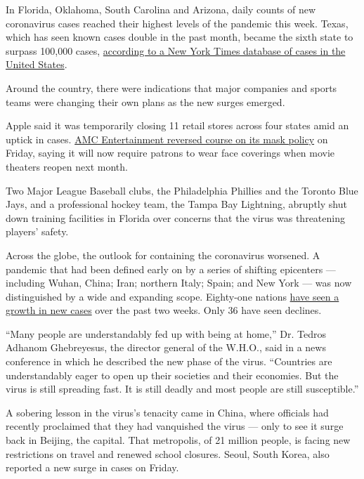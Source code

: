 In Florida, Oklahoma, South Carolina and Arizona, daily counts of new
coronavirus cases reached their highest levels of the pandemic this
week. Texas, which has seen known cases double in the past month, became
the sixth state to surpass 100,000 cases,
\href{https://www.nytimes.com/interactive/2020/us/texas-coronavirus-cases.html}{according
to a New York Times database of cases in the United States}.

Around the country, there were indications that major companies and
sports teams were changing their own plans as the new surges emerged.

Apple said it was temporarily closing 11 retail stores across four
states amid an uptick in cases.
\href{https://www.nytimes.com/2020/06/18/business/AMC-theaters-masks-coronavirus.html}{AMC
Entertainment reversed course on its mask policy} on Friday, saying it
will now require patrons to wear face coverings when movie theaters
reopen next month.

Two Major League Baseball clubs, the Philadelphia Phillies and the
Toronto Blue Jays, and a professional hockey team, the Tampa Bay
Lightning, abruptly shut down training facilities in Florida over
concerns that the virus was threatening players' safety.

Across the globe, the outlook for containing the coronavirus worsened. A
pandemic that had been defined early on by a series of shifting
epicenters --- including Wuhan, China; Iran; northern Italy; Spain; and
New York --- was now distinguished by a wide and expanding scope.
Eighty-one nations
\href{https://www.nytimes.com/interactive/2020/world/coronavirus-maps.html}{have
seen a growth in new cases} over the past two weeks. Only 36 have seen
declines.

``Many people are understandably fed up with being at home,'' Dr. Tedros
Adhanom Ghebreyesus, the director general of the W.H.O., said in a news
conference in which he described the new phase of the virus. ``Countries
are understandably eager to open up their societies and their economies.
But the virus is still spreading fast. It is still deadly and most
people are still susceptible.''

A sobering lesson in the virus's tenacity came in China, where officials
had recently proclaimed that they had vanquished the virus --- only to
see it surge back in Beijing, the capital. That metropolis, of 21
million people, is facing new restrictions on travel and renewed school
closures. Seoul, South Korea, also reported a new surge in cases on
Friday.

